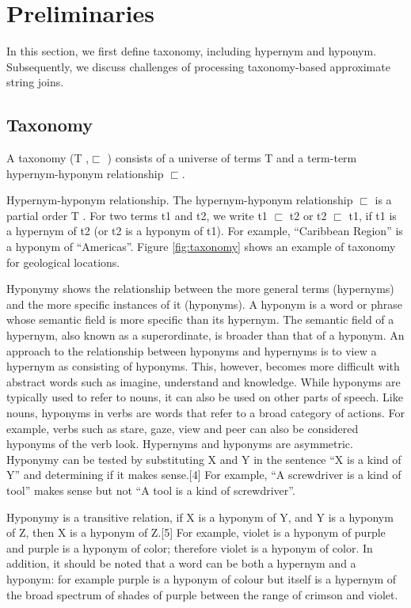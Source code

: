 \section{Preliminaries} \label{sec:preliminaries}



In this section, we first  define taxonomy, including
hypernym and hyponym. Subsequently,
we discuss challenges of processing taxonomy-based approximate string joins.


\subsection{Taxonomy}

A taxonomy (T ,$\sqsubset$ ) consists of a universe of terms T and
a term-term hypernym-hyponym relationship $\sqsubset$.

Hypernym-hyponym relationship. The hypernym-hyponym relationship
$\sqsubset$ is a partial order T . For two terms t1 and t2,
we write t1 $\sqsubset$ t2 or t2 $\sqsubset$ t1, if t1 is a hypernym of t2 (or t2
is a hyponym of t1). For example, ``Caribbean Region'' is a hyponym of
``Americas''. Figure  \ref{fig:taxonomy} shows an example of taxonomy for geological locations.



Hyponymy shows the relationship between the more general terms (hypernyms) and the more specific instances of it (hyponyms). A hyponym is a word or phrase whose semantic field is more specific than its hypernym. The semantic field of a hypernym, also known as a superordinate, is broader than that of a hyponym. An approach to the relationship between hyponyms and hypernyms is to view a hypernym as consisting of hyponyms. This, however, becomes more difficult with abstract words such as imagine, understand and knowledge. While hyponyms are typically used to refer to nouns, it can also be used on other parts of speech. Like nouns, hyponyms in verbs are words that refer to a broad category of actions. For example, verbs such as stare, gaze, view and peer can also be considered hyponyms of the verb look.
Hypernyms and hyponyms are asymmetric. Hyponymy can be tested by substituting X and Y in the sentence ``X is a kind of Y'' and determining if it makes sense.[4] For example, ``A screwdriver is a kind of tool''  makes sense but not ``A tool is a kind of screwdriver''.


Hyponymy is a transitive relation, if X is a hyponym of Y, and Y is a hyponym of Z, then X is a hyponym of Z.[5] For example, violet is a hyponym of purple and purple is a hyponym of color; therefore violet is a hyponym of color. In addition, it should be noted that a word can be both a hypernym and a hyponym: for example purple is a hyponym of colour but itself is a hypernym of the broad spectrum of shades of purple between the range of crimson and violet.

